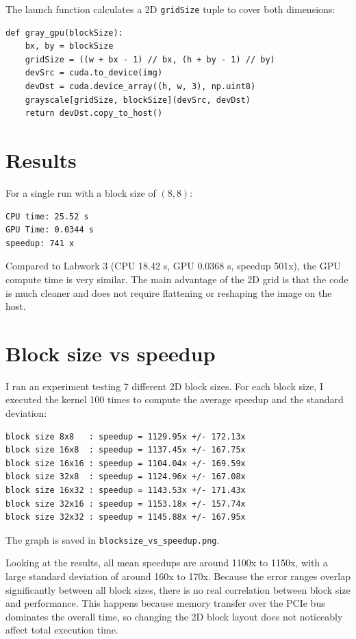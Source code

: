 \documentclass{report}
\begin{document}
The launch function calculates a 2D \texttt{gridSize} tuple to cover both dimensions:

\begin{verbatim}
def gray_gpu(blockSize):
    bx, by = blockSize
    gridSize = ((w + bx - 1) // bx, (h + by - 1) // by) 
    devSrc = cuda.to_device(img)
    devDst = cuda.device_array((h, w, 3), np.uint8)
    grayscale[gridSize, blockSize](devSrc, devDst)
    return devDst.copy_to_host()
\end{verbatim}

\section*{Results}

For a single run with a block size of $(8, 8)$:

\begin{verbatim}
CPU time: 25.52 s
GPU Time: 0.0344 s
speedup: 741 x
\end{verbatim}

Compared to Labwork 3 (CPU 18.42 s, GPU 0.0368 s, speedup 501x), the GPU compute time is very similar. The main advantage of the 2D grid is that the code is much cleaner and does not require flattening or reshaping the image on the host.

\section*{Block size vs speedup}

I ran an experiment testing 7 different 2D block sizes. For each block size, I executed the kernel 100 times to compute the average speedup and the standard deviation:

\begin{verbatim}
block size 8x8   : speedup = 1129.95x +/- 172.13x
block size 16x8  : speedup = 1137.45x +/- 167.75x
block size 16x16 : speedup = 1104.04x +/- 169.59x
block size 32x8  : speedup = 1124.96x +/- 167.08x
block size 16x32 : speedup = 1143.53x +/- 171.43x
block size 32x16 : speedup = 1153.18x +/- 157.74x
block size 32x32 : speedup = 1145.88x +/- 167.95x
\end{verbatim}

The graph is saved in \texttt{blocksize\_vs\_speedup.png}.

Looking at the results, all mean speedups are around 1100x to 1150x, with a large standard deviation of around 160x to 170x. Because the error ranges overlap significantly between all block sizes, there is no real correlation between block size and performance. This happens because memory transfer over the PCIe bus dominates the overall time, so changing the 2D block layout does not noticeably affect total execution time.
\end{document}
